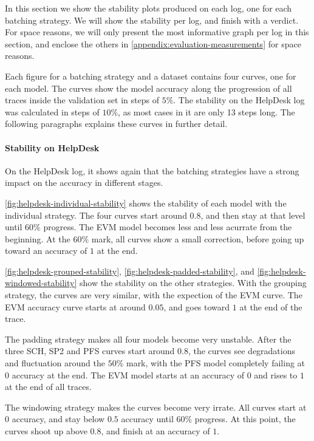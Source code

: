 In this section we show the stability plots produced on each log, one for each batching strategy.
We will show the stability per log, and finish with a verdict.
For space reasons, we will only present the most informative graph per log in this section, and enclose the others in \autoref{appendix:evaluation-measurements} for space reasons.

Each figure for a batching strategy and a dataset contains four curves, one for each model.
The curves show the model accuracy along the progression of all traces inside the validation set in steps of $5\%$.
The stability on the HelpDesk log was calculated in steps of $10\%$, as most cases in it are only 13 steps long.
The following paragraphs explains these curves in further detail.

\paragraph{Stability on HelpDesk}
On the HelpDesk log, it shows again that the batching strategies have a strong impact on the accuracy in different stages.

\autoref{fig:helpdesk-individual-stability} shows the stability of each model with the individual strategy.
The four curves start around $0.8$, and then stay at that level until $60\%$ progress.
The EVM model becomes less and less acurrate from the beginning.
At the $60\%$ mark, all curves show a small correction, before going up toward an accuracy of $1$ at the end.

\autoref{fig:helpdesk-grouped-stability}, \autoref{fig:helpdesk-padded-stability}, and \autoref{fig:helpdesk-windowed-stability} show the stability on the other strategies.
With the grouping strategy, the curves are very similar, with the expection of the EVM curve.
The EVM accuracy curve starts at around $0.05$, and goes toward $1$ at the end of the trace.

The padding strategy makes all four models become very unstable.
After the three SCH, SP2 and PFS curves start around $0.8$, the curves see degradations and fluctuation around the $50\%$ mark, with the PFS model completely failing at $0$ accuracy at the end.
The EVM model starts at an accuracy of $0$ and rises to $1$ at the end of all traces.

The windowing strategy makes the curves become very irrate.
All curves start at 0 accuracy, and stay below $0.5$ accuracy until $60\%$ progress.
At this point, the curves shoot up above $0.8$, and finish at an accuracy of $1$.

